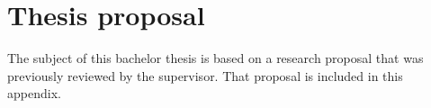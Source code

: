 \documentclass[english,dit,thesis]{hogentreport}
\begin{document}






%
%




\appendix

\chapter{Thesis proposal}
\label{ch:onderzoeksvoorstel}

The subject of this bachelor thesis is based on a research proposal that was previously reviewed by the supervisor. That proposal is included in this appendix.











\backmatter{}

\setlength\bibitemsep{2pt} %
\printbibliography[heading=bibintoc]
\end{document}
